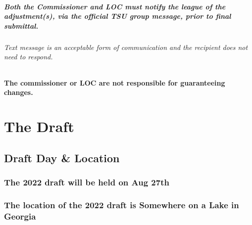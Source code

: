 \documentclass[
]{book}
\begin{document}
\hypertarget{both-the-commissioner-and-loc-must-notify-the-league-of-the-adjustments-via-the-official-tsu-group-message-prior-to-final-submittal.}{%
\paragraph{Both the Commissioner and LOC must notify the league of the adjustment(s), via the official TSU group message, prior to final submittal.}\label{both-the-commissioner-and-loc-must-notify-the-league-of-the-adjustments-via-the-official-tsu-group-message-prior-to-final-submittal.}}

\hypertarget{text-message-is-an-acceptable-form-of-communication-and-the-recipient-does-not-need-to-respond.}{%
\subparagraph{Text message is an acceptable form of communication and the recipient does not need to respond.}\label{text-message-is-an-acceptable-form-of-communication-and-the-recipient-does-not-need-to-respond.}}

\hypertarget{the-commissioner-or-loc-are-not-responsible-for-guaranteeing-changes.}{%
\subsubsection{The commissioner or LOC are not responsible for guaranteeing changes.}\label{the-commissioner-or-loc-are-not-responsible-for-guaranteeing-changes.}}

\hypertarget{the-draft}{%
\chapter{The Draft}\label{the-draft}}

\hypertarget{draft-day-location}{%
\section{Draft Day \& Location}\label{draft-day-location}}

\hypertarget{the-2022-draft-will-be-held-on-aug-27th}{%
\subsection{The 2022 draft will be held on Aug 27th}\label{the-2022-draft-will-be-held-on-aug-27th}}

\hypertarget{the-location-of-the-2022-draft-is-somewhere-on-a-lake-in-georgia}{%
\subsection{The location of the 2022 draft is Somewhere on a Lake in Georgia}\label{the-location-of-the-2022-draft-is-somewhere-on-a-lake-in-georgia}}
\end{document}
